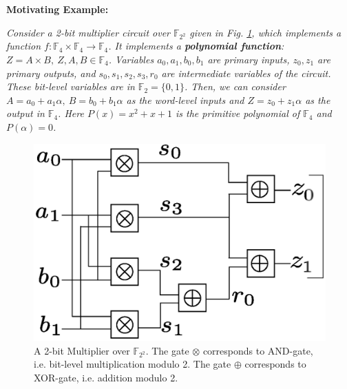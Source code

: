 \begin{Example}
{\bf Motivating Example:} {\it
Consider a 2-bit multiplier circuit over ${\mathbb{F}}_{2^2}$ given in
Fig. \ref{fig:mul2bit}, which implements a function $f: {\mathbb{F}}_4
\times {\mathbb{F}}_4 \rightarrow {\mathbb{F}}_4$. It implements a
{\bf polynomial function}: $Z = A \times B, ~Z, A, B \in
{\mathbb{F}}_4$. Variables $a_0, a_1, b_0, b_1$ are primary inputs,
$z_0, z_1$ are primary outputs, and $s_0, s_1, s_2, s_3, r_0$ are
intermediate variables of the circuit. 
These bit-level variables are in ${\mathbb{F}}_2 = \{0, 1\}$.
Then, we can consider $A = a_0 + a_1 \alpha, ~B = b_0 +
b_1 \alpha$ as the word-level inputs and $Z = z_0 + z_1 \alpha$ 
as the output in ${\mathbb{F}}_4$. Here $P(x) = x^2 + x + 1$ is the primitive
polynomial of ${\mathbb{F}}_4$ and $P(\alpha) = 0$. 
\begin{figure}[htb]
\centerline{
\includegraphics[scale=0.4]{2bitmult.eps}
}
\caption{\small A 2-bit Multiplier over ${\mathbb{F}}_{2^2}$. The gate
  $\otimes$ corresponds to AND-gate, i.e. bit-level multiplication
  modulo 2. The gate $\oplus$ corresponds to XOR-gate, i.e. addition
  modulo 2.} 
\label{fig:mul2bit}
\end{figure}

}
\end{Example}
